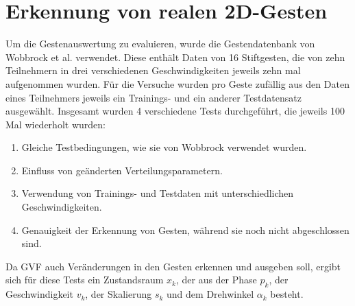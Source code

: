 \documentclass{llncs}
\begin{document}
\section{Erkennung von realen 2D-Gesten}
Um die Gestenauswertung zu evaluieren, wurde die Gestendatenbank von Wobbrock et al.\cite{Wobbrock2007} verwendet. Diese enthält Daten von 16 Stiftgesten, die von zehn Teilnehmern in drei verschiedenen Geschwindigkeiten jeweils zehn mal aufgenommen wurden. Für die Versuche wurden pro Geste zufällig aus den Daten eines Teilnehmers jeweils ein Trainings- und ein anderer Testdatensatz ausgewählt. Insgesamt wurden 4 verschiedene Tests durchgeführt, die jeweils 100 Mal wiederholt wurden:
\begin{enumerate}
\item Gleiche Testbedingungen, wie sie von Wobbrock\cite{Wobbrock2007} verwendet wurden.
\item Einfluss von geänderten Verteilungsparametern.
\item Verwendung von Trainings- und Testdaten mit unterschiedlichen Geschwindigkeiten.
\item Genauigkeit der Erkennung von Gesten, während sie noch nicht abgeschlossen sind.
\end{enumerate}
Da GVF auch Veränderungen in den Gesten erkennen und ausgeben soll, ergibt sich für diese Tests ein Zustandsraum $x_k$, der aus der Phase $p_k$, der Geschwindigkeit $v_k$, der Skalierung $s_k$ und dem Drehwinkel $\alpha_k$ besteht.





\end{document}

